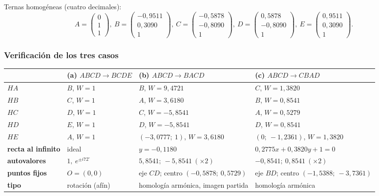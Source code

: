 Ternas homogéneas (cuatro decimales):
\[
A=\begin{pmatrix}0\\1\\1\end{pmatrix},\
B=\begin{pmatrix}-0{,}9511\\0{,}3090\\1\end{pmatrix},\
C=\begin{pmatrix}-0{,}5878\\-0{,}8090\\1\end{pmatrix},\
D=\begin{pmatrix}0{,}5878\\-0{,}8090\\1\end{pmatrix},\
E=\begin{pmatrix}0{,}9511\\0{,}3090\\1\end{pmatrix}.
\]

\subsubsection{Verificación de los tres casos}
\begin{center}\small
\begin{tabularx}{\textwidth}{>{\bfseries}l X X X}
\toprule
& (a) \(ABCD\to BCDE\) & (b) \(ABCD\to BACD\) & (c) \(ABCD\to CBAD\)\\
\midrule
\(HA\) & \(B\), \(W=1\) & \(B\), \(W=9{,}4721\) & \(C\), \(W=1{,}3820\)\\
\(HB\) & \(C\), \(W=1\) & \(A\), \(W=3{,}6180\) & \(B\), \(W=0{,}8541\)\\
\(HC\) & \(D\), \(W=1\) & \(C\), \(W=-5{,}8541\) & \(A\), \(W=0{,}5279\)\\
\(HD\) & \(E\), \(W=1\) & \(D\), \(W=-5{,}8541\) & \(D\), \(W=0{,}8541\)\\
\(HE\) & \(A\), \(W=1\) & \((-3{,}0777;\ 1)\), \(W=3{,}6180\) & \((0;\ -1{,}2361)\), \(W=1{,}3820\)\\
recta al infinito & ideal & \(y=-0{,}1180\) & \(0{,}2775x+0{,}3820y+1=0\)\\
autovalores & \(1,\ e^{\pm i72^\circ}\) & \(5{,}8541;\ -5{,}8541\ (\times2)\) &
\(-0{,}8541;\ 0{,}8541\ (\times2)\)\\
puntos fijos & \(O=(0,0)\) & eje \(CD\); centro \((-0{,}5878;\ 0{,}5729)\) &
eje \(BD\); centro \((-1{,}5388;\ -3{,}7361)\)\\
tipo & rotación (afín) & homología armónica, imagen partida & homología armónica\\
\bottomrule
\end{tabularx}
\end{center}

